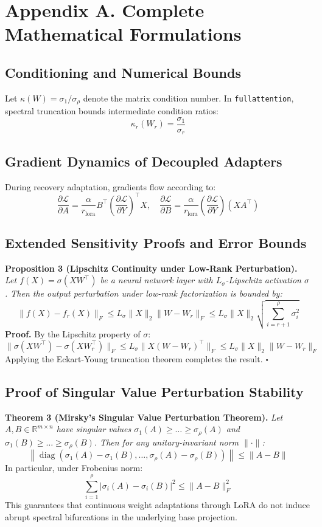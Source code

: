 {\section*{Appendix A. Complete Mathematical Formulations}

\subsection*{Conditioning and Numerical Bounds}
Let $\kappa(W) = \sigma_1 / \sigma_\rho$ denote the matrix condition number. In \texttt{fullattention}, spectral truncation bounds intermediate condition ratios:
\[
\kappa_r(W_r) = \frac{\sigma_1}{\sigma_r}
\]

\subsection*{Gradient Dynamics of Decoupled Adapters}
During recovery adaptation, gradients flow according to:
\[
\frac{\partial \mathcal{L}}{\partial A} = \frac{\alpha}{r_{\text{lora}}} B^\top \left( \frac{\partial \mathcal{L}}{\partial Y} \right)^\top X, \quad \frac{\partial \mathcal{L}}{\partial B} = \frac{\alpha}{r_{\text{lora}}} \left( \frac{\partial \mathcal{L}}{\partial Y} \right) (X A^\top)
\]

\subsection*{Extended Sensitivity Proofs and Error Bounds}
\textbf{Proposition 3 (Lipschitz Continuity under Low-Rank Perturbation).} \textit{Let $f(X) = \sigma(X W^\top)$ be a neural network layer with $L_\sigma$-Lipschitz activation $\sigma$. Then the output perturbation under low-rank factorization is bounded by:}
\[
\|f(X) - f_r(X)\|_F \le L_\sigma \|X\|_2 \|W - W_r\|_F \le L_\sigma \|X\|_2 \sqrt{\sum_{i=r+1}^\rho \sigma_i^2}
\]
\textbf{Proof.} By the Lipschitz property of $\sigma$:
\[
\|\sigma(X W^\top) - \sigma(X W_r^\top)\|_F \le L_\sigma \|X (W - W_r)^\top\|_F \le L_\sigma \|X\|_2 \|W - W_r\|_F
\]
Applying the Eckart-Young truncation theorem completes the result. $\square$

\subsection*{Proof of Singular Value Perturbation Stability}
\textbf{Theorem 3 (Mirsky's Singular Value Perturbation Theorem).} \textit{Let $A, B \in \mathbb{R}^{m \times n}$ have singular values $\sigma_1(A) \ge \dots \ge \sigma_\rho(A)$ and $\sigma_1(B) \ge \dots \ge \sigma_\rho(B)$. Then for any unitary-invariant norm $\|\cdot\|$:}
\[
\left\| \operatorname{diag}(\sigma_1(A) - \sigma_1(B), \dots, \sigma_\rho(A) - \sigma_\rho(B)) \right\| \le \|A - B\|
\]
In particular, under Frobenius norm:
\[
\sum_{i=1}^\rho |\sigma_i(A) - \sigma_i(B)|^2 \le \|A - B\|_F^2
\]
This guarantees that continuous weight adaptations through LoRA do not induce abrupt spectral bifurcations in the underlying base projection.

}
